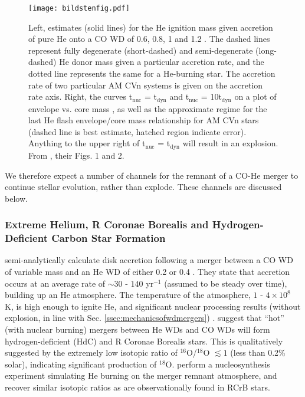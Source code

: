 \begin{figure}
\centerline{\texttt{[image: bildstenfig.pdf]}}
\caption{Left, estimates (solid lines) for the He ignition mass given accretion of pure He onto a CO WD of 0.6, 0.8, 1 and 1.2 {\Msun}.  The dashed lines represent fully degenerate (short-dashed) and semi-degenerate (long-dashed) He donor mass given a particular accretion rate, and the dotted line represents the same for a He-burning star.  The accretion rate of two particular AM CVn systems is given on the accretion rate axis.  Right, the curves t$_{\mathrm{nuc}}$  = t$_{\mathrm{dyn}}$ and t$_{\mathrm{nuc}}$  = 10t$_{\mathrm{dyn}}$ on a plot of envelope vs. core mass , as well as the approximate regime for the last He flash envelope/core mass relationship for AM CVn stars (dashed line is best estimate, hatched region indicate error).  Anything to the upper right of t$_{\mathrm{nuc}}$  = t$_{\mathrm{dyn}}$ will result in an explosion.  From \cite{bild+07}, their Figs. 1 and 2.}
\label{bildstenfig}
\end{figure}

We therefore expect a number of channels for the remnant of a CO-He merger to continue stellar evolution, rather than explode.  These channels are discussed below.


\subsubsection{Extreme Helium, R Coronae Borealis and Hydrogen-Deficient Carbon Star Formation}

\cite{clay+07} semi-analytically calculate disk accretion following a merger between a CO WD of variable mass and an He WD of either 0.2 or 0.4 {\Msun}.  They state that accretion occurs at an average rate of $\sim 30$ - $140$ {\Msun} yr$^{-1}$ (assumed to be steady over time), building up an He atmosphere.   The temperature of the atmosphere, $1$ - $4 \times 10^8$ K, is high enough to ignite He, and significant nuclear processing results (without explosion, in line with Sec. \ref{ssec:mechanicsofwdmergers}) \citep{clay+07}.  \citeauthor{clay+07} suggest that ``hot'' (with nuclear burning) mergers between He WDs and CO WDs will form hydrogen-deficient (HdC) and R Coronae Borealis stars.  This is qualitatively suggested by the extremely low isotopic ratio of $^{16}$O/$^{18}$O $\lesssim 1$ (less than 0.2\% solar), indicating significant production of $^{18}$O.  \citeauthor{clay+07} perform a nucleosynthesis experiment simulating He burning on the merger remnant atmosphere, and recover similar isotopic ratios as are observationally found in RCrB stars.

